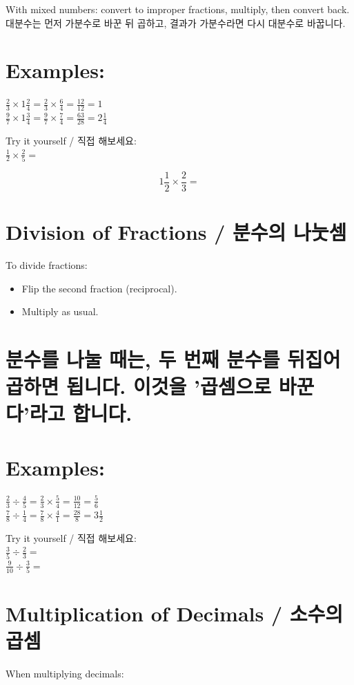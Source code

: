 \documentclass[10pt]{article}
\begin{document}
With mixed numbers: convert to improper fractions, multiply, then convert back.\\
대분수는 먼저 가분수로 바꾼 뒤 곱하고, 결과가 가분수라면 다시 대분수로 바꿉니다.

\section*{Examples:}
$\frac{2}{3} \times 1 \frac{2}{4}=\frac{2}{3} \times \frac{6}{4}=\frac{12}{12}=1$\\
$\frac{9}{7} \times 1 \frac{3}{4}=\frac{9}{7} \times \frac{7}{4}=\frac{63}{28}=2 \frac{1}{4}$

Try it yourself / 직접 해보세요:\\
$\frac{1}{2} \times \frac{2}{5}=$

$$
1 \frac{1}{2} \times \frac{2}{3}=
$$

\section*{Division of Fractions / 분수의 나눗셈}
To divide fractions:

\begin{itemize}
  \item Flip the second fraction (reciprocal).
  \item Multiply as usual.
\end{itemize}

\section*{분수를 나눌 때는, 두 번째 분수를 뒤집어 곱하면 됩니다. 이것을 '곱셈으로 바꾼다'라고 합니다.}
\section*{Examples:}
$\frac{2}{3} \div \frac{4}{5}=\frac{2}{3} \times \frac{5}{4}=\frac{10}{12}=\frac{5}{6}$\\
$\frac{7}{8} \div \frac{1}{4}=\frac{7}{8} \times \frac{4}{1}=\frac{28}{8}=3 \frac{1}{2}$

Try it yourself / 직접 해보세요:\\
$\frac{3}{5} \div \frac{2}{3}=$\\
$\frac{9}{10} \div \frac{3}{5}=$

\section*{Multiplication of Decimals / 소수의 곱셈}
When multiplying decimals:
\end{document}
